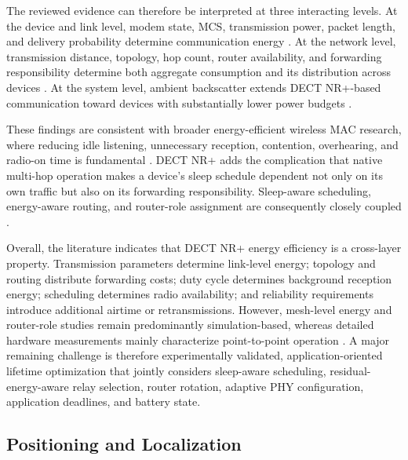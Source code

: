 The reviewed evidence can therefore be interpreted at three interacting
levels. At the device and link level, modem state, MCS, transmission power,
packet length, and delivery probability determine communication energy
\cite{bandaraExperimentalValidationAnalysis2025,
grafWhatExpectWhen2026,
grafParetoOptimalityApproach2026a}. At the network level, transmission
distance, topology, hop count, router availability, and forwarding
responsibility determine both aggregate consumption and its distribution
across devices
\cite{kovalchukovDECT2020NewRadio2022,
nihtilaEnergyConsumptionDECT20202022,
nihtilaEnergySavingRouter2022}. At the system level, ambient backscatter
extends DECT NR+-based communication toward devices with substantially lower
power budgets
\cite{liaoDataAssistedBackscatter2025}.

These findings are consistent with broader energy-efficient wireless MAC
research, where reducing idle listening, unnecessary reception, contention,
overhearing, and radio-on time is fundamental
\cite{tsaoSurveyEnergyEfficient2011}. DECT NR+ adds the complication that
native multi-hop operation makes a device's sleep schedule dependent not only
on its own traffic but also on its forwarding responsibility. Sleep-aware
scheduling, energy-aware routing, and router-role assignment are consequently
closely coupled
\cite{nihtilaEnergyConsumptionDECT20202022,
nihtilaEnergySavingRouter2022}.

Overall, the literature indicates that DECT NR+ energy efficiency is a
cross-layer property. Transmission parameters determine link-level energy;
topology and routing distribute forwarding costs; duty cycle determines
background reception energy; scheduling determines radio availability; and
reliability requirements introduce additional airtime or retransmissions.
However, mesh-level energy and router-role studies remain predominantly
simulation-based, whereas detailed hardware measurements mainly characterize
point-to-point operation
\cite{nihtilaEnergyConsumptionDECT20202022,
nihtilaEnergySavingRouter2022,
bandaraExperimentalValidationAnalysis2025,
grafWhatExpectWhen2026,
grafParetoOptimalityApproach2026a}. A major remaining challenge is therefore
experimentally validated, application-oriented lifetime optimization that
jointly considers sleep-aware scheduling, residual-energy-aware relay
selection, router rotation, adaptive PHY configuration, application deadlines,
and battery state.


\subsection{Positioning and Localization}
\label{subsec:positioning}

